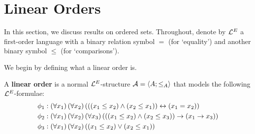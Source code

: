 \section{Linear Orders}

In this section, we discuss results on ordered sets. Throughout, denote by $\mathcal{L}^{E}$ a first-order language with a binary relation symbol $=$ (for `equality') and another binary symbol $\le$ (for `comparisons').

We begin by defining what a linear order is.

\begin{boxdefinition}\label{Ch2:Def:LinearOrder}
    A \textbf{linear order} is a normal $\mathcal{L}^{E}$-structure $\mathcal{A} = \left\langle A; \le_{A} \right\rangle$ that models the following $\mathcal{L}^{E}$-formulae:
    \begin{align*}
        \phi_1 &: \left( \forall x_1 \right)\left( \forall x_2 \right)\left( \left( \left( x_1 \le x_2 \right) \land \left( x_2 \le x_1 \right) \right) \leftrightarrow \left( x_1 = x_2 \right) \right) \\
        \phi_2 &: \left( \forall x_1 \right)\left( \forall x_2 \right)\left( \forall x_3 \right)\left( \left( \left( x_1 \le x_2 \right) \land \left( x_2 \le x_3 \right) \right) \to \left( x_1 \to x_3 \right) \right) \\
        \phi_3 &: \left( \forall x_1 \right) \left( \forall x_2 \right) \left( \left( x_1 \le x_2 \right) \lor \left( x_2 \le x_1 \right) \right)
    \end{align*}
\end{boxdefinition}